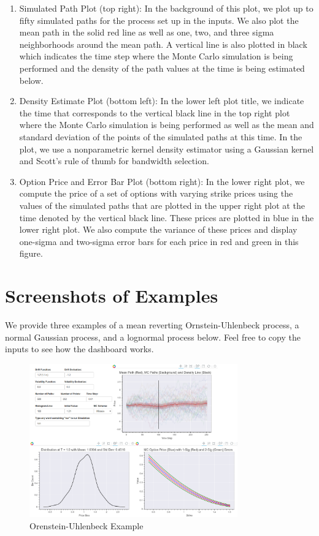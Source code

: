 \documentclass{amsart}
\begin{document}
\begin{enumerate} 
    \item Simulated Path Plot (top right):  In the background of this plot, we plot up to fifty simulated paths for the process set up in the inputs.  We also plot the mean path in the solid red line as well as one, two, and three sigma neighborhoods around the mean path.  A vertical line is also plotted in black which indicates the time step where the Monte Carlo simulation is being performed and the density of the path values at the time is being estimated below.
    \item Density Estimate Plot (bottom left): In the lower left plot title, we indicate the time that corresponds to the vertical black line in the top right plot where the Monte Carlo simulation is being performed as well as the mean and standard deviation of the points of the simulated paths at this time.  In the plot, we use a nonparametric kernel density estimator using a Gaussian kernel and Scott's rule of thumb for bandwidth selection.  
    \item Option Price and Error Bar Plot (bottom right):  In the lower right plot, we compute the 
        price of a set of options with varying strike prices using the values of the simulated 
        paths that are plotted in the upper right plot at the time denoted by the vertical black line.  
        These prices are plotted in blue in the lower right plot.  We also compute the variance of these 
        prices and display one-sigma and two-sigma error bars for each price in red and green in this 
        figure. 
\end{enumerate} 

\section{Screenshots of Examples} 

We provide three examples of a mean reverting Ornstein-Uhlenbeck process, a normal Gaussian process, 
and a lognormal process below.  Feel free to copy the inputs to see how the dashboard works.

\begin{figure}[h!]
    \centering
    \includegraphics[width=0.8\textwidth]{fig1.eps}
    \caption{Orenstein-Uhlenbeck Example}
    \label{fig1}
\end{figure}
\end{document}
